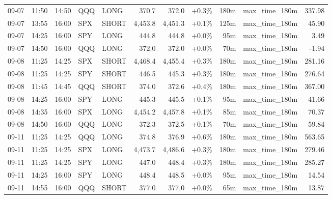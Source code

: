 \documentclass[11pt,a4paper,twoside]{article}
\begin{document}
\begin{center}
\begin{longtable}{>{\color{txtmain}}l l l l l r r r r >{\color{txtmain}}l r}
09-07 & 11:50 & 14:50 & QQQ & LONG & 370.7 & 372.0 & \textcolor{wingreen}{+0.3\%} & 180m & max\_time\_180m & \textcolor{wingreen}{337.98} \\
09-07 & 13:55 & 16:00 & SPX & SHORT & 4,453.8 & 4,451.3 & \textcolor{wingreen}{+0.1\%} & 125m & max\_time\_180m & \textcolor{wingreen}{45.90} \\
09-07 & 14:25 & 16:00 & SPY & LONG & 444.8 & 444.8 & \textcolor{wingreen}{+0.0\%} & 95m & max\_time\_180m & \textcolor{wingreen}{3.49} \\
09-07 & 14:50 & 16:00 & QQQ & LONG & 372.0 & 372.0 & \textcolor{wingreen}{+0.0\%} & 70m & max\_time\_180m & \textcolor{lossred}{-1.94} \\
09-08 & 11:25 & 14:25 & SPX & SHORT & 4,468.4 & 4,455.4 & \textcolor{wingreen}{+0.3\%} & 180m & max\_time\_180m & \textcolor{wingreen}{281.16} \\
09-08 & 11:25 & 14:25 & SPY & SHORT & 446.5 & 445.3 & \textcolor{wingreen}{+0.3\%} & 180m & max\_time\_180m & \textcolor{wingreen}{276.64} \\
09-08 & 11:45 & 14:45 & QQQ & SHORT & 374.0 & 372.6 & \textcolor{wingreen}{+0.4\%} & 180m & max\_time\_180m & \textcolor{wingreen}{367.00} \\
09-08 & 14:25 & 16:00 & SPY & LONG & 445.3 & 445.5 & \textcolor{wingreen}{+0.1\%} & 95m & max\_time\_180m & \textcolor{wingreen}{41.66} \\
09-08 & 14:35 & 16:00 & SPX & LONG & 4,454.2 & 4,457.8 & \textcolor{wingreen}{+0.1\%} & 85m & max\_time\_180m & \textcolor{wingreen}{70.37} \\
09-08 & 14:50 & 16:00 & QQQ & LONG & 372.3 & 372.5 & \textcolor{wingreen}{+0.1\%} & 70m & max\_time\_180m & \textcolor{wingreen}{59.84} \\
09-11 & 11:25 & 14:25 & QQQ & LONG & 374.8 & 376.9 & \textcolor{wingreen}{+0.6\%} & 180m & max\_time\_180m & \textcolor{wingreen}{563.65} \\
09-11 & 11:25 & 14:25 & SPX & LONG & 4,473.7 & 4,486.6 & \textcolor{wingreen}{+0.3\%} & 180m & max\_time\_180m & \textcolor{wingreen}{279.46} \\
09-11 & 11:25 & 14:25 & SPY & LONG & 447.0 & 448.4 & \textcolor{wingreen}{+0.3\%} & 180m & max\_time\_180m & \textcolor{wingreen}{285.27} \\
09-11 & 14:25 & 16:00 & SPY & LONG & 448.4 & 448.5 & \textcolor{wingreen}{+0.0\%} & 95m & max\_time\_180m & \textcolor{wingreen}{14.54} \\
09-11 & 14:55 & 16:00 & QQQ & SHORT & 377.0 & 377.0 & \textcolor{wingreen}{+0.0\%} & 65m & max\_time\_180m & \textcolor{wingreen}{13.87} \\

\end{longtable}
\end{center}
\end{document}
